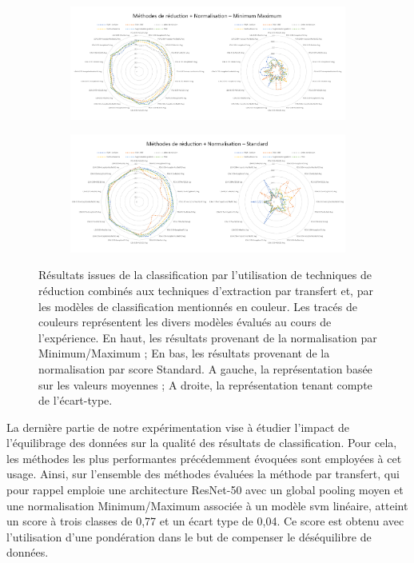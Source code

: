 \begin{figure}[H]
    \centering
    
    \begin{subfigure}{\textwidth}
      \includegraphics[width=\textwidth]{contents/chapter_4/resources/results_image_classification_reduction_mms.pdf}
    \end{subfigure}
    
    \begin{subfigure}{\textwidth}
      \includegraphics[width=\textwidth]{contents/chapter_4/resources/results_image_classification_reduction_ss.pdf}
    \end{subfigure}
    
    \caption{Résultats issues de la classification par l'utilisation de techniques de réduction combinés aux techniques d'extraction par transfert et, par les modèles de classification mentionnés en couleur. Les tracés de couleurs représentent les divers modèles évalués au cours de l'expérience. En haut, les résultats provenant de la normalisation par Minimum/Maximum ; En bas, les résultats provenant de la normalisation par score Standard. A gauche, la représentation basée sur les valeurs moyennes ; A droite, la représentation tenant compte de l'écart-type.}
    \label{fig:results_image_classification_reduction}
\end{figure}\par

La dernière partie de notre expérimentation vise à étudier l'impact de l'équilibrage des données sur la qualité des résultats de classification. Pour cela, les méthodes les plus performantes précédemment évoquées sont employées à cet usage. Ainsi, sur l'ensemble des méthodes évaluées la méthode par transfert, qui pour rappel emploie une architecture ResNet-50 avec un global pooling moyen et une normalisation Minimum/Maximum associée à un modèle \gls{svm} linéaire, atteint un score à trois classes de 0,77 et un écart type de 0,04. Ce score est obtenu avec l'utilisation d'une pondération dans le but de compenser le déséquilibre de données.\par

